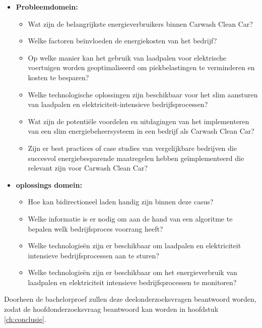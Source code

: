 \begin{itemize}
  \item \textbf{Probleemdomein:}
  \begin{itemize}
    \item Wat zijn de belangrijkste energieverbruikers binnen Carwash Clean Car?
    \item Welke factoren beïnvloeden de energiekosten van het bedrijf?
    \item Op welke manier kan het gebruik van laadpalen voor elektrische voertuigen worden geoptimaliseerd om piekbelastingen te verminderen en kosten te besparen?
    \item Welke technologische oplossingen zijn beschikbaar voor het slim aansturen van laadpalen en elektriciteit-intensieve bedrijfsprocessen?
    \item Wat zijn de potentiële voordelen en uitdagingen van het implementeren van een slim energiebeheersysteem in een bedrijf als Carwash Clean Car?
    \item Zijn er best practices of case studies van vergelijkbare bedrijven die succesvol energiebesparende maatregelen hebben geïmplementeerd die relevant zijn voor Carwash Clean Car?
  \end{itemize}
  \item  \textbf{oplossings domein:}
  \begin{itemize}
    \item Hoe kan bidirectioneel laden handig zijn binnen deze casus?
    \item Welke informatie is er nodig om aan de hand van een algoritme te bepalen welk bedrijfsproces voorrang heeft?
    \item Welke technologieën zijn er beschikbaar om laadpalen en elektriciteit intensieve bedrijfsprocessen aan te sturen?
    \item Welke technologieën zijn er beschikbaar om het energieverbruik van laadpalen en elektriciteit intensieve bedrijfsprocessen te monitoren?
  \end{itemize}
\end{itemize}

Doorheen de bachelorproef zullen deze deelonderzoeksvragen beantwoord worden, zodat de hoofdonderzoeksvraag beantwoord kan worden in hoofdstuk \ref{ch:conclusie}.

\section{}%
\label{sec:onderzoeksdoelstelling}

